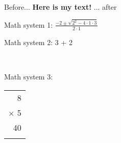 \documentclass[11pt, twoside]{article}   	%
\newcommand{\makebig}[1]{%
			{\Large\bfseries {#1}}
}%
\newcommand{\quadracticform}[3]{%
			${\frac{-#2 \pm \sqrt{ #2^2 -4 \cdot #1 \cdot #3}}{#2 \cdot #1}}$
}%
\newcommand{\sumoftwo}[2]{%
	#1 + #2
}%
\newcommand{\mtable}[3]{%
	\quad\large{
	\begin{tabular}{r}
	#3\\
	${\times}$  #2\\
	\hline
	#1\\
	\vspace{10pt}\\
	\end{tabular}
}}%
\begin{document}
	Before... \makebig{Here is my text!} ... after

Math system 1:
	\quadracticform{1}{2}{3}
	
Math system 2:
      \sumoftwo{3}{2}
\ \ \ 

Math system 3:
	\mtable{40}{5}{8}
	
\newlength{\func}
\setlength{\func}{10pt}
\the\func
\typeout\func
\end{document}
